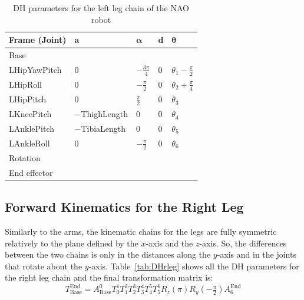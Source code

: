 \begin{table}[!t]
\centering
\caption{DH parameters for the left leg chain of the NAO robot}
\label{tab:DHlleg}
\begin{tabular}{|l|>{\centering\arraybackslash}m{2.55cm}|>{\centering\arraybackslash}m{2.55cm}|>{\centering\arraybackslash}m{2.55cm}|>{\centering\arraybackslash}m{2.55cm}|}
\hline
\textbf{Frame (Joint)} & $\mathbf{a}$ & $\boldsymbol{\alpha}$ & $\mathbf{d}$ & $\boldsymbol{\theta}$\\ \hline
Base & \multicolumn{4}{c|}{$A(0,\text{\footnotesize{HipOffsetY}},\text{\footnotesize{$-$HipOffsetZ}})$} \\ \hline
LHipYawPitch & $0$ & $-\frac{3\pi}{4}$ & $0$ & $\theta_1 - \frac{\pi}{2}$ \\ \hline
LHipRoll & $0$ & $-\frac{\pi}{2}$ & $0$ & $\theta_2 + \frac{\pi}{4}$ \\ \hline
LHipPitch & $0$ & $\frac{\pi}{2}$ & $0$ & $\theta_3$ \\ \hline
LKneePitch & \footnotesize{$-$ThighLength} & $0$ & $0$ & $\theta_4$ \\ \hline
LAnklePitch & \footnotesize{$-$TibiaLength} & $0$ & $0$ & $\theta_5$ \\ \hline
LAnkleRoll & $0$ & $-\frac{\pi}{2}$ & $0$ & $\theta_6$ \\ \hline
Rotation & \multicolumn{4}{c|}{$R_z(\pi)R_y(-\tfrac{\pi}{2})$} \\ \hline
End effector & \multicolumn{4}{c|}{$A(0,0,\text{\footnotesize{$-$FootHeight}})$} \\ \hline
\end{tabular}
\end{table}



\subsection{Forward Kinematics for the Right Leg}
Similarly to the arms, the kinematic chains for the legs are fully symmetric relatively to the plane defined by the $x$-axis and the $z$-axis. So, the differences between the two chains is only in the distances along the $y$-axis and in the joints that rotate about the $y$-axis. Table~\ref{tab:DHrleg} shows all the DH parameters for the right leg chain and the final transformation matrix is: 
\[
T^\text{End}_\text{Base} = A^0_\text{Base}T^1_0T^2_1T^3_2T^4_3T^5_4T^6_5R_z(\pi)R_y(-\tfrac{\pi}{2})A^\text{End}_{6}
\]

